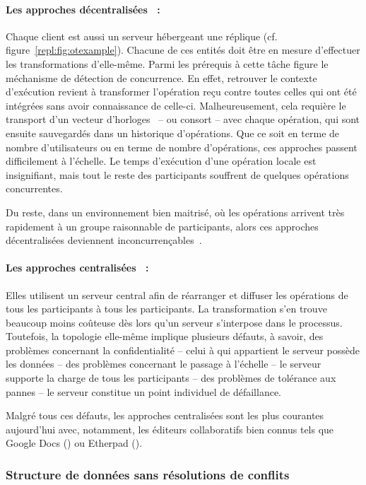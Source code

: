 \paragraph{Les approches décentralisées~\cite{sun2009contextbased} :}
Chaque client est aussi un serveur hébergeant une réplique
(cf. figure~\ref{repl:fig:otexample}). Chacune de ces entités doit être en
mesure d'effectuer les transformations d'elle-même. Parmi les prérequis à cette
tâche figure le méchanisme de détection de concurrence. En effet, retrouver le
contexte d'exécution revient à transformer l'opération reçu contre toutes celles
qui ont été intégrées sans avoir connaissance de celle-ci. Malheureusement, cela
requière le transport d'un vecteur d'horloges~\cite{lamport1978time} -- ou
consort -- avec chaque opération, qui sont ensuite sauvegardés dans un
historique d'opérations. Que ce soit en terme de nombre d'utilisateurs ou en
terme de nombre d'opérations, ces approches passent difficilement à
l'échelle. Le temps d'exécution d'une opération locale est insignifiant, mais
tout le reste des participants souffrent de quelques opérations concurrentes.

\noindent Du reste, dans un environnement bien maitrisé, où les opérations
arrivent très rapidement à un groupe raisonnable de participants, alors ces
approches décentralisées deviennent inconcurrençables~\cite{mehdi2014merging}.

\paragraph{Les approches centralisées~\cite{nichols1995high} :} Elles utilisent
un serveur central afin de réarranger et diffuser les opérations de tous les
participants à tous les participants. La transformation s'en trouve beaucoup
moins coûteuse dès lors qu'un serveur s'interpose dans le processus. Toutefois,
la topologie elle-même implique plusieurs défauts, à savoir, des problèmes
concernant la confidentialité -- celui à qui appartient le serveur possède les
données -- des problèmes concernant le passage à l'échelle -- le serveur
supporte la charge de tous les participants -- des problèmes de tolérance aux
pannes -- le serveur constitue un point individuel de défaillance.

\noindent Malgré tous ces défauts, les approches centralisées sont les plus
courantes aujourd'hui avec, notamment, les éditeurs collaboratifs bien connus
tels que Google Docs (\REF) ou Etherpad (\REF).


\subsubsection{Structure de données sans résolutions de conflits}
\label{repl:subsubsec:crdts}

